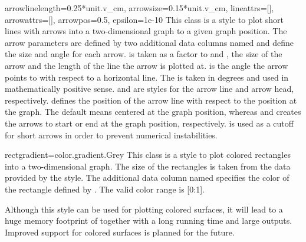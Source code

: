 \begin{classdesc}{arrow}{linelength=0.25*unit.v\_cm, %
                         arrowsize=0.15*unit.v\_cm,
                         lineattrs=[], arrowattrs=[], arrowpos=0.5,
                         epsilon=1e-10}
  This class is a style to plot short lines with arrows into a
  two-dimensional graph to a given graph position. The arrow
  parameters are defined by two additional data columns named
   and  define the size and angle for each
  arrow.  is taken as a factor to  and
  , the size of the arrow and the length of the line
  the arrow is plotted at.  is the angle the arrow points
  to with respect to a horizontal line. The  is taken in
  degrees and used in mathematically positive sense. 
  and  are styles for the arrow line and arrow head,
  respectively.  defines the position of the arrow line
  with respect to the position at the graph. The default 
  means centered at the graph position, whereas  and 
  creates the arrows to start or end at the graph position,
  respectively.  is used as a cutoff for short arrows in
  order to prevent numerical instabilities.
\end{classdesc} %

\begin{classdesc}{rect}{gradient=color.gradient.Grey} %
  This class is a style to plot colored rectangles into a
  two-dimensional graph. The size of the rectangles is taken from
  the data provided by the  style. The additional
  data column named  specifies the color of the rectangle
  defined by . The valid color range is [0:1].

  \begin{note}
    Although this style can be used for plotting colored surfaces, it
    will lead to a huge memory footprint of \PyX{} together with a
    long running time and large outputs. Improved support for colored
    surfaces is planned for the future.
  \end{note}
\end{classdesc} %

